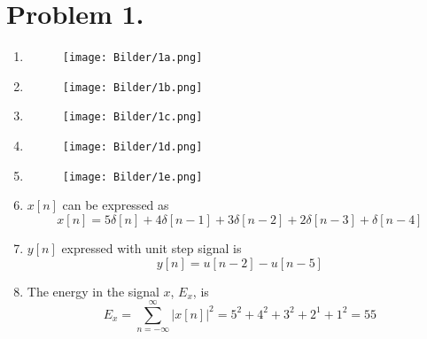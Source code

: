 \documentclass[a4paper,11pt,norsk]{article}
\begin{document}


\section*{Problem 1.}
\begin{enumerate}
    \item 
        \begin{figure}[H]
            \center
            \texttt{[image: Bilder/1a.png]}
        \end{figure}
    \item 
        \begin{figure}[H]
            \center
            \texttt{[image: Bilder/1b.png]}
        \end{figure}
    \item 
        \begin{figure}[H]
            \center
            \texttt{[image: Bilder/1c.png]}
        \end{figure}
    \item 
        \begin{figure}[H]
            \center
            \texttt{[image: Bilder/1d.png]}
        \end{figure}
    \item 
        \begin{figure}[H]
            \center
            \texttt{[image: Bilder/1e.png]}
        \end{figure}

    \item $x[n]$ can be expressed as
        \[
            x[n] = 5\delta[n] + 4\delta[n-1] + 3\delta[n-2] + 2\delta[n-3] + \delta[n-4]
        \]
    \item $y[n]$ expressed with unit step signal is
        \[
            y[n] = u[n - 2] - u[n - 5]
        \]
    \item The energy in the signal $x$, $E_x$, is 
        \[
            E_x = \sum_{n=-\infty}^{\infty}|x[n]|^2 = 5^2 + 4^2 + 3^2 + 2^1 + 1^2 = 55
        \]
\end{enumerate}
\end{document}
